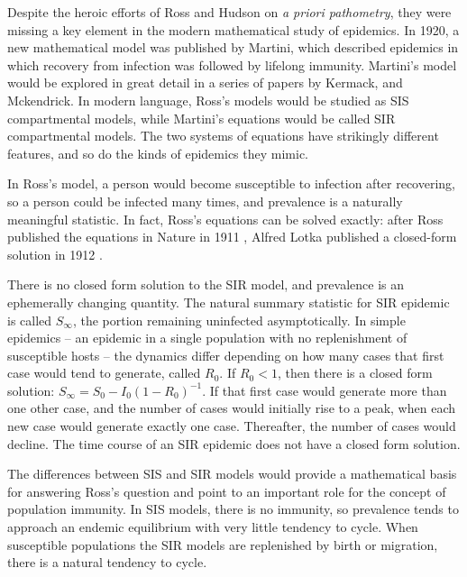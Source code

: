 \documentclass[
]{book}
\begin{document}
Despite the heroic efforts of Ross and Hudson on \emph{a priori pathometry}, they were missing a key element in the modern mathematical study of epidemics. In 1920, a new mathematical model was published by Martini, which described epidemics in which recovery from infection was followed by lifelong immunity.
Martini's model would be explored in great detail in a series of papers by Kermack, and Mckendrick.
In modern language, Ross's models would be studied as SIS compartmental models, while Martini's equations would be called SIR compartmental models.
The two systems of equations have strikingly different features, and so do the kinds of epidemics they mimic.

In Ross's model, a person would become susceptible to infection after recovering, so a person could be infected many times, and prevalence is a naturally meaningful statistic. In fact, Ross's equations can be solved exactly: after Ross published the equations in Nature in 1911 \autocite{RossR1911Nature}, Alfred Lotka published a closed-form solution in 1912 \autocite{LotkaAJ1912Nature}.

There is no closed form solution to the SIR model, and prevalence is an ephemerally changing quantity.
The natural summary statistic for SIR epidemic is called \(S_\infty\), the portion remaining uninfected asymptotically.
In simple epidemics -- an epidemic in a single population with no replenishment of susceptible hosts -- the dynamics differ depending on how many cases that first case would tend to generate, called \(R_0\).
If \(R_0 < 1\), then there is a closed form solution: \(S_\infty = S_0 - I_0(1-R_0)^{-1}\).
If that first case would generate more than one other case, and the number of cases would initially rise to a peak, when each new case would generate exactly one case.
Thereafter, the number of cases would decline.
The time course of an SIR epidemic does not have a closed form solution.

The differences between SIS and SIR models would provide a mathematical basis for answering Ross's question and point to an important role for the concept of population immunity.
In SIS models, there is no immunity, so prevalence tends to approach an endemic equilibrium with very little tendency to cycle.
When susceptible populations the SIR models are replenished by birth or migration, there is a natural tendency to cycle.
\end{document}
